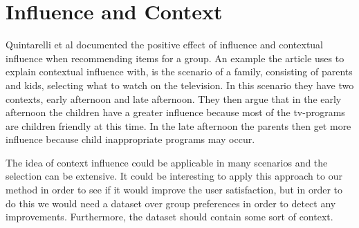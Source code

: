 \section{Influence and Context}
Quintarelli et al documented the positive effect of influence and contextual influence when recommending items for a group\cite{contextinfluence}. An example the article uses to explain contextual influence with, is the scenario of a family, consisting of parents and kids, selecting what to watch on the television. In this scenario they have two contexts, early afternoon and late afternoon. They then argue that in the early afternoon the children have a greater influence because most of the tv-programs are children friendly at this time. In the late afternoon the parents then get more influence because child inappropriate programs may occur. 

The idea of context influence could be applicable in many scenarios and the selection can be extensive. It could be interesting to apply this approach to our method in order to see if it would improve the user satisfaction, but in order to do this we would need a dataset over group preferences in order to detect any improvements. Furthermore, the dataset should contain some sort of context. 